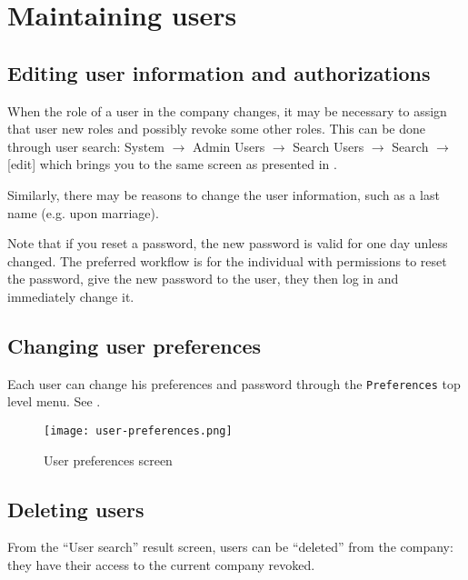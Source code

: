 \section{Maintaining users}
\label{sec-user-management-maintenance}

\subsection{Editing user information and authorizations}
\label{subsec-user-maintenance-editing-authorizations}

When the role of a user in the company changes, it may be necessary to assign
that user new roles and possibly revoke some other roles. This can be done through
user search: System $\rightarrow$ Admin Users $\rightarrow$ Search Users $\rightarrow$ Search $\rightarrow$ {[}edit] which brings you to the same screen as presented in
.

Similarly, there may be reasons to change the user information, such as a last name
(e.g. upon marriage).

Note that if you reset a password, the new password is valid for one day unless
changed.  The preferred workflow is for the individual with permissions to reset
the password, give the new password to the user, they then log in and
immediately change it.

\subsection{Changing user preferences}
\label{subsec-user-management-user-prefs}

Each user can change his preferences and password through the \texttt{Preferences}
top level menu. See .

\begin{figure}[h]
\centering
\texttt{[image: user-preferences.png]}
\caption{User preferences screen}
\label{fig:user-preferences}
\end{figure}


\subsection{Deleting users}
\label{subsec-user-management-deletion}

From the ``User search'' result screen, users can be ``deleted'' from the company:
they have their access to the current company revoked.

